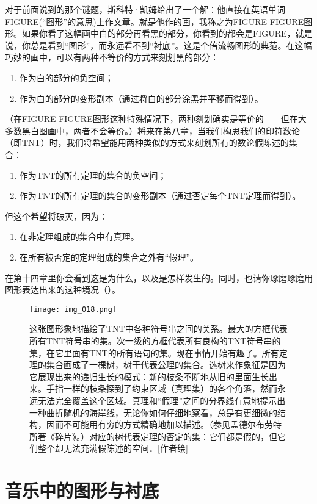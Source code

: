 对于前面说到的那个谜题，斯科特·凯姆给出了一个解：他直接在英语单词FIGURE(“图形”的意思)上作文章。就是他作的画，我称之为FIGURE-FIGURE图形。如果你看了这幅画中白的部分再看黑的部分，你看到的都会是FIGURE，就是说，你总是看到“图形”，而永远看不到“衬底”。这是个倍流畅图形的典范。在这幅巧妙的画中，可以有两种不等价的方式来刻划黑的部分：
\begin{enumerate}
\item 作为白的部分的负空间；
\item 作为白的部分的变形副本（通过将白的部分涂黑并平移而得到）。
\end{enumerate}
（在FIGURE-FIGURE图形这种特殊情况下，两种刻划确实是等价的——但在大多数黑白图画中，两者不会等价。）将来在第八章，当我们构思我们的印符数论（即TNT）时，我们将希望能用两种类似的方式来刻划所有的数论假陈述的集合：
\begin{enumerate}
\item 作为TNT的所有定理的集合的负空间；
\item 作为TNT的所有定理的集合的变形副本（通过否定每个TNT定理而得到）。
\end{enumerate}
但这个希望将破灭，因为：
\begin{enumerate}
\item 在非定理组成的集合中有真理。
\item 在所有被否定的定理组成的集合之外有“假理”。
\end{enumerate}
在第十四章里你会看到这是为什么，以及是怎样发生的。同时，也请你琢磨琢磨用图形表达出来的这种境况（）。

\begin{figure}
\texttt{[image: img\_018.png]}
\caption[各类串之间的关系图示。]
  {这张图形象地描绘了TNT中各种符号串之间的关系。最大的方框代表所有TNT符号串的集。次一级的方框代表所有良构的TNT符号串的集，在它里面有TNT的所有语句的集。现在事情开始有趣了。所有定理的集合画成了一棵树，树干代表公理的集合。选树来作象征是因为它展现出来的递归生长的模式：新的枝条不断地从旧的里面生长出来。手指一样的枝条探到了约束区域（真理集）的各个角落，然而永远无法完全覆盖这个区域。真理和“假理”之间的分界线有意地提示出一种曲折随机的海岸线，无论你如何仔细地察看，总是有更细微的结构，因而不可能用有穷的方式精确地加以描述。（参见孟德尔布劳特所著《碎片》。）对应的树代表定理的否定的集：它们都是假的，但它们整个却无法充满假陈述的空间．[作者绘]}
\end{figure}

\section{音乐中的图形与衬底}

